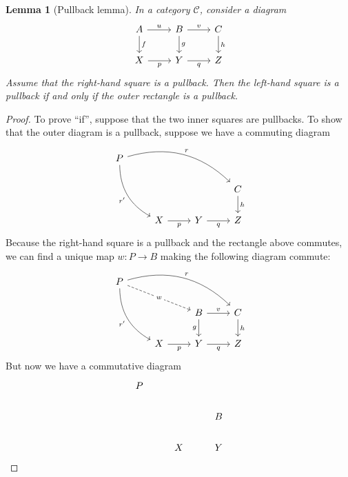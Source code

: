 \documentclass[10pt,oneside]{book}
\def\~#1{\mathscr{#1}}
\theoremstyle{plain}
\newtheorem{lem}[thm]{Lemma}
\theoremstyle{definition}
\theoremstyle{remark}
\numberwithin{equation}{section}
\numberwithin{figure}{section}
\begin{document}
\begin{lem}[Pullback lemma]

 In a category $\~C$, consider a diagram
\[\begin{tikzcd}
    A & B & C \\
    {X} & {Y} & {Z}
    \arrow["g", from=1-2, to=2-2]
    \arrow["v", from=1-2, to=1-3]
    \arrow["{h}", from=1-3, to=2-3]
    \arrow["{q}"', from=2-2, to=2-3]
    \arrow["u", from=1-1, to=1-2]
    \arrow["{p}"', from=2-1, to=2-2]
    \arrow["f", from=1-1, to=2-1]
\end{tikzcd}\]
Assume that the right-hand square is a pullback. Then the left-hand square is a pullback if and only if the outer rectangle is a pullback.
\end{lem}

\begin{proof}
To prove ``if'', suppose that the two inner squares are pullbacks. To show that the outer diagram is a pullback, suppose we have a commuting diagram 
    \[\begin{tikzcd}
    P \\
    &&& C \\
    & {X} & {Y} & {Z}
    \arrow["{h}", from=2-4, to=3-4]
    \arrow["{q}"', from=3-3, to=3-4]
    \arrow["{p}"', from=3-2, to=3-3]
    \arrow["{r'}"', bend right, from=1-1, to=3-2]
    \arrow["r", bend left, from=1-1, to=2-4]
    \end{tikzcd}\]
Because the right-hand square is a pullback and the rectangle above commutes, we can find a unique map $w: P \to B$ making the following diagram commute:
\begin{equation}
    \label{eq:pullback_lemma_rightsq}
    \begin{tikzcd}
        P \\
        && B & C \\
        & {X} & {Y} & {Z}
        \arrow["{h}", from=2-4, to=3-4]
        \arrow["{q}"', from=3-3, to=3-4]
        \arrow["{p}"', from=3-2, to=3-3]
        \arrow["{r'}"', bend right, from=1-1, to=3-2]
        \arrow["r", bend left, from=1-1, to=2-4]
        \arrow["g"', from=2-3, to=3-3]
        \arrow["v", from=2-3, to=2-4]
        \arrow["w"{description}, dashed, from=1-1, to=2-3]
    \end{tikzcd}
\end{equation}
But now we have a commutative diagram 
\[\begin{tikzcd}
    P \\
    && B \\
    & {X} & {Y}

\end{tikzcd}\]
\end{proof}
\end{document}
